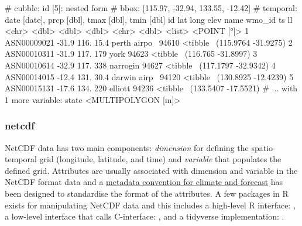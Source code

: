 \documentclass[
]{jss}
\begin{document}
\begin{CodeChunk}
\begin{CodeOutput}
# cubble:   id [5]: nested form
# bbox:     [115.97, -32.94, 133.55, -12.42]
# temporal: date [date], prcp [dbl], tmax [dbl], tmin [dbl]
  id            lat  long  elev name         wmo_id ts                        ll
  <chr>       <dbl> <dbl> <dbl> <chr>         <dbl> <list>           <POINT [°]>
1 ASN00009021 -31.9  116.  15.4 perth airpo~  94610 <tibble~ (115.9764 -31.9275)
2 ASN00010311 -31.9  117. 179   york          94623 <tibble~  (116.765 -31.8997)
3 ASN00010614 -32.9  117. 338   narrogin      94627 <tibble~ (117.1797 -32.9342)
4 ASN00014015 -12.4  131.  30.4 darwin airp~  94120 <tibble~ (130.8925 -12.4239)
5 ASN00015131 -17.6  134. 220   elliott       94236 <tibble~ (133.5407 -17.5521)
# ... with 1 more variable: state <MULTIPOLYGON [m]>
\end{CodeOutput}
\end{CodeChunk}

\hypertarget{netcdf}{%
\subsubsection{netcdf}\label{netcdf}}

NetCDF data has two main components: \emph{dimension} for defining the
spatio-temporal grid (longitude, latitude, and time) and \emph{variable}
that populates the defined grid. Attributes are usually associated with
dimension and variable in the NetCDF format data and a
\href{http://cfconventions.org/}{metadata convention for climate and
forecast} has been designed to standardise the format of the attributes.
A few packages in R exists for manipulating NetCDF data and this
includes a high-level R interface:  \citep{ncdf4}, a
low-level interface that calls C-interface: 
\citep{rnetcdf, michna2013rnetcdf}, and a tidyverse implementation:
 \citep{tidync}.
\end{document}
